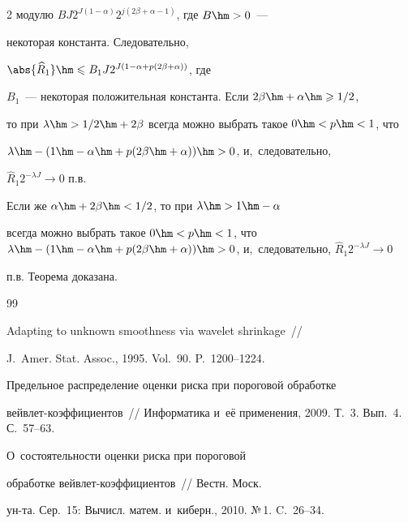 \begin{multicols}{2}
 модулю $B J2^{J(1-\alpha)}2^{j(2\beta+\alpha-1)}$, где $B\hm>0$~--- 

 некоторая константа. Следовательно, 

 $\abs{\widehat{R}_1}\hm\leqslant B_1J 2^{J(1-\alpha+p(2\beta+\alpha))}$, где 

 $B_1$~--- некоторая положительная константа. Если $2\beta\hm+\alpha\hm\geqslant1/2$, 

 то при $\lambda\hm>1/2\hm+2\beta$ всегда можно выбрать такое $0\hm<p\hm<1$, что 

 $\lambda\hm-(1\hm-\alpha\hm+p(2\beta\hm+\alpha))\hm>0$, и,~следовательно, 

 $\widehat{R}_1 2^{-\lambda J}\rightarrow 0$ п.в. 

 Если же $\alpha\hm+2\beta\hm<1/2$, то при $\lambda\hm>1\hm-\alpha$ 

 всегда можно выбрать такое $0\hm<p\hm<1$, что $\lambda\hm-(1\hm-\alpha\hm+p(2\beta

 \hm+\alpha))\hm>0$, и,~следовательно, $\widehat{R}_1 2^{-\lambda J}\rightarrow 0$ 

 п.в. Теорема до\-ка\-зана.





{\small\frenchspacing

 {%


 \begin{thebibliography}{99}


 Adapting to unknown smoothness via wavelet shrinkage~// 

J.~Amer. Stat. Assoc., 1995. Vol.~90. P.~1200--1224.




 Предельное распределение оценки риска при пороговой обработке 

вейв\-лет-ко\-эф\-фи\-ци\-ен\-тов~// Информатика и~её применения, 2009. Т.~3. Вып.~4. С.~57--63.




 О~со\-сто\-ятель\-ности оценки риска при пороговой 

обработке вейв\-лет-ко\-эф\-фи\-ци\-ен\-тов~// Вестн. Моск.

ун-та. Сер.~15: Вычисл. матем. и~киберн., 2010. №\,1. C.~26--34.




\end{thebibliography}}}
\end{multicols}
